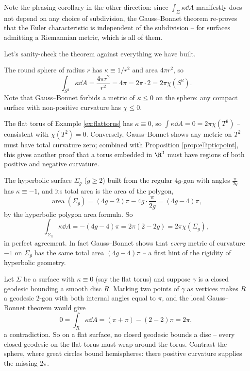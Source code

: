 \begin{remark}
    Note the pleasing corollary in the other direction: since $\int_\Sigma \kappa \dd A$ manifestly does not depend on any choice of subdivision, the Gauss--Bonnet theorem re-proves that the Euler characteristic is independent of the subdivision -- for surfaces admitting a Riemannian metric, which is all of them.
\end{remark}

Let's sanity-check the theorem against everything we have built.

\begin{example}
    The round sphere of radius $r$ has $\kappa \equiv 1/r^2$ and area $4\pi r^2$, so
    $$
    \int_{S^2} \kappa \dd A = \frac{4 \pi r^2}{r^2} = 4\pi = 2\pi \cdot 2 = 2\pi \chi(S^2).
    $$
    Note that Gauss--Bonnet forbids a metric of $\kappa \leq 0$ on the sphere: any compact surface with non-positive curvature has $\chi \leq 0$.
\end{example}

\begin{example}
    The flat torus of Example \ref{ex:flattorus} has $\kappa \equiv 0$, so $\int \kappa \dd A = 0 = 2\pi\chi(T^2)$ -- consistent with $\chi(T^2) = 0$. Conversely, Gauss--Bonnet shows any metric on $T^2$ must have total curvature zero; combined with Proposition \ref{prop:ellipticpoint}, this gives another proof that a torus embedded in $\R^3$ must have regions of both positive and negative curvature.
\end{example}

\begin{example}
    The hyperbolic surface $\Sigma_g$ ($g \geq 2$) built from the regular $4g$-gon with angles $\frac{\pi}{2g}$ has $\kappa \equiv -1$, and its total area is the area of the polygon,
    $$
    \operatorname{area}(\Sigma_g) = (4g - 2)\pi - 4g \cdot \frac{\pi}{2g} = (4g - 4)\pi,
    $$
    by the hyperbolic polygon area formula. So
    $$
    \int_{\Sigma_g} \kappa \dd A = -(4g - 4)\pi = 2\pi(2 - 2g) = 2\pi \chi(\Sigma_g),
    $$
    in perfect agreement. In fact Gauss--Bonnet shows that \emph{every} metric of curvature $-1$ on $\Sigma_g$ has the same total area $(4g - 4)\pi$ -- a first hint of the rigidity of hyperbolic geometry.
\end{example}

\begin{example}
    Let $\Sigma$ be a surface with $\kappa \equiv 0$ (say the flat torus) and suppose $\gamma$ is a closed geodesic bounding a smooth disc $R$. Marking two points of $\gamma$ as vertices makes $R$ a geodesic $2$-gon with both internal angles equal to $\pi$, and the local Gauss--Bonnet theorem would give
    $$
    0 = \int_R \kappa \dd A = (\pi + \pi) - (2 - 2)\pi = 2\pi,
    $$
    a contradiction. So on a flat surface, no closed geodesic bounds a disc -- every closed geodesic on the flat torus must wrap around the torus. Contrast the sphere, where great circles bound hemispheres: there positive curvature supplies the missing $2\pi$.
\end{example}

